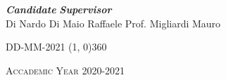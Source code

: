 \begin{titlepage}
\vspace{3cm}
\begin{normalsize}
\begin{flushleft}
  
  \hspace{62pt} \textbf{\textit{Candidate}} \hspace{130pt} \textbf{\textit{Supervisor}}\\
  \vspace{5pt}
  \hspace{27pt} {Di Nardo Di Maio Raffaele} \hspace{65pt} {Prof. Migliardi Mauro}\\
\end{flushleft}
\end{normalsize}

\vfill
\begin{center}
\textsc{DD-MM-2021}
\hspace{-0.2cm}
\line(1, 0){360}

\textsc{Accademic Year 2020-2021}
\end{center}
\end{titlepage}
\cleardoublepage %
\thispagestyle{empty}
\addtolength{\oddsidemargin}{+0.7cm}